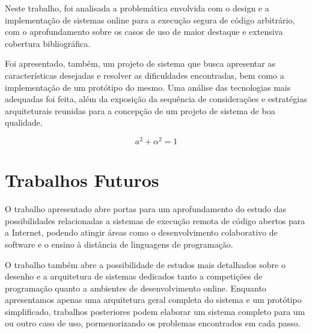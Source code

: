 \documentclass[ruledheader, 12pt]{abnt}
\begin{document}
Neste trabalho, foi analisada a problemática envolvida com o design e a implementação de sistemas online para a execução segura de código arbitrário, com o aprofundamento sobre os casos de uso de maior destaque e extensiva cobertura bibliográfica.

Foi apresentado, também, um projeto de sistema que busca apresentar as características desejadas e resolver as dificuldades encontradas, bem como a implementação de um protótipo do mesmo. Uma análise das tecnologias mais adequadas foi feita, além da exposição da sequência de considerações e estratégias arquiteturais reunidas para a concepção de um projeto de sistema de boa qualidade.

\[ a^2 + \alpha^2 = 1 \]

\section{Trabalhos Futuros}

O trabalho apresentado abre portas para um aprofundamento do estudo das possibilidades relacionadas a sistemas de execução remota de código abertos para a Internet, podendo atingir áreas como o desenvolvimento colaborativo de software e o ensino à distância de linguagens de programação.

O trabalho também abre a possibilidade de estudos mais detalhados sobre o desenho e a arquitetura de sistemas dedicados tanto a competições de programação quanto a ambientes de desenvolvimento online. Enquanto apresentamos apenas uma arquitetura geral completa do sistema e um protótipo simplificado, trabalhos posteriores podem elaborar um sistema completo para um ou outro caso de uso, pormenorizando os problemas encontrados em cada passo.




\end{document}
